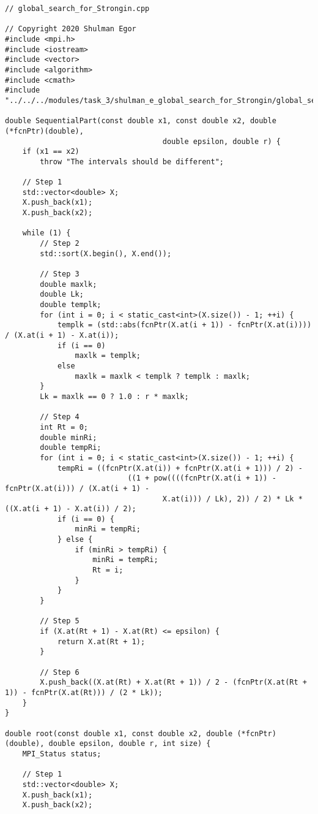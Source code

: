 \documentclass{report}
\begin{document}
\begin{lstlisting}
// global_search_for_Strongin.cpp

// Copyright 2020 Shulman Egor
#include <mpi.h>
#include <iostream>
#include <vector>
#include <algorithm>
#include <cmath>
#include "../../../modules/task_3/shulman_e_global_search_for_Strongin/global_search_for_Strongin.h"

double SequentialPart(const double x1, const double x2, double (*fcnPtr)(double),
                                    double epsilon, double r) {
    if (x1 == x2)
        throw "The intervals should be different";

    // Step 1
    std::vector<double> X;
    X.push_back(x1);
    X.push_back(x2);

    while (1) {
        // Step 2
        std::sort(X.begin(), X.end());

        // Step 3
        double maxlk;
        double Lk;
        double templk;
        for (int i = 0; i < static_cast<int>(X.size()) - 1; ++i) {
            templk = (std::abs(fcnPtr(X.at(i + 1)) - fcnPtr(X.at(i)))) / (X.at(i + 1) - X.at(i));
            if (i == 0)
                maxlk = templk;
            else
                maxlk = maxlk < templk ? templk : maxlk;
        }
        Lk = maxlk == 0 ? 1.0 : r * maxlk;

        // Step 4
        int Rt = 0;
        double minRi;
        double tempRi;
        for (int i = 0; i < static_cast<int>(X.size()) - 1; ++i) {
            tempRi = ((fcnPtr(X.at(i)) + fcnPtr(X.at(i + 1))) / 2) -
                            ((1 + pow((((fcnPtr(X.at(i + 1)) - fcnPtr(X.at(i))) / (X.at(i + 1) -
                                    X.at(i))) / Lk), 2)) / 2) * Lk * ((X.at(i + 1) - X.at(i)) / 2);
            if (i == 0) {
                minRi = tempRi;
            } else {
                if (minRi > tempRi) {
                    minRi = tempRi;
                    Rt = i;
                }
            }
        }

        // Step 5
        if (X.at(Rt + 1) - X.at(Rt) <= epsilon) {
            return X.at(Rt + 1);
        }

        // Step 6
        X.push_back((X.at(Rt) + X.at(Rt + 1)) / 2 - (fcnPtr(X.at(Rt + 1)) - fcnPtr(X.at(Rt))) / (2 * Lk));
    }
}

double root(const double x1, const double x2, double (*fcnPtr)(double), double epsilon, double r, int size) {
    MPI_Status status;

    // Step 1
    std::vector<double> X;
    X.push_back(x1);
    X.push_back(x2);


\end{lstlisting}
\end{document}
